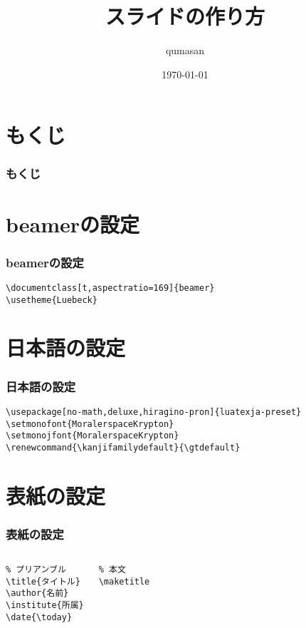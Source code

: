 \documentclass[t,aspectratio=169]{beamer}
\title{スライドの作り方}
\author{qumasan}
\institute{qumasan}
\date{\today}
\renewcommand{\kanjifamilydefault}{\gtdefault}
\begin{document}
\begin{frame}
\maketitle
\end{frame}

\section*{もくじ}
\begin{frame}
    \frametitle{もくじ}
    \tableofcontents
\end{frame}

\section{beamerの設定}
\begin{frame}[fragile]
    \frametitle{beamerの設定}
    \begin{verbatim}
\documentclass[t,aspectratio=169]{beamer}
\usetheme{Luebeck}
    \end{verbatim}
\end{frame}

\section{日本語の設定}
\begin{frame}[fragile]
    \frametitle{日本語の設定}
    \begin{verbatim}
\usepackage[no-math,deluxe,hiragino-pron]{luatexja-preset}
\setmonofont{MoralerspaceKrypton}
\setmonojfont{MoralerspaceKrypton}
\renewcommand{\kanjifamilydefault}{\gtdefault}
    \end{verbatim}
\end{frame}

\section{表紙の設定}
\begin{frame}[fragile]
    \frametitle{表紙の設定}
    \begin{columns}
        \begin{verbatim}
% プリアンブル
\title{タイトル}
\author{名前}
\institute{所属}
\date{\today}
        \end{verbatim}

        \begin{verbatim}
% 本文
\maketitle
        \end{verbatim}
    \end{columns}
\end{frame}
\end{document}
